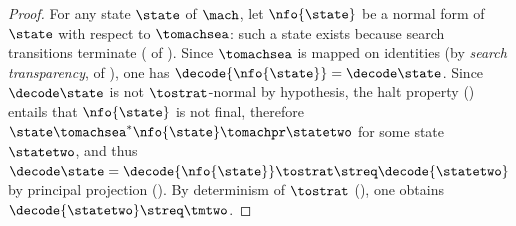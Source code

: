 \begin{proof}
  For any state $\state$ of $\mach$, let $\nfo{\state}$ be a normal form of $\state$ with respect to $\tomachsea$: such a state exists because search transitions terminate ( of ).
  Since $\tomachsea$ is mapped on identities (by \emph{search transparency}, \ie {} of ), one has $\decode{\nfo{\state}} = \decode\state$.
  Since $\decode\state$ is not $\tostrat$-normal by hypothesis, the halt property () entails that $\nfo{\state}$ is not final, therefore $\state \tomachsea^* \nfo{\state} \tomachpr \statetwo$ for some state $\statetwo$, and thus $\decode\state = \decode{\nfo{\state}} \tostrat \streq\decode{\statetwo}$ by principal projection ().
  By determinism of $\tostrat$ (), one obtains $\decode{\statetwo} \streq \tmtwo$.
\end{proof}

